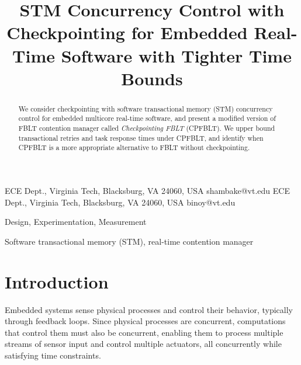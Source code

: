 \documentclass[preprint]{sigplanconf}
\begin{document}
\copyrightdata{[to be supplied]} 


\title{STM Concurrency Control with Checkpointing for Embedded Real-Time Software with Tighter Time Bounds}

           {ECE Dept., Virginia Tech, Blacksburg, VA 24060, USA}
           {shambake@vt.edu}
           {ECE Dept., Virginia Tech, Blacksburg, VA 24060, USA}
           {binoy@vt.edu}

\maketitle

\begin{abstract}
We consider checkpointing with software transactional memory (STM) concurrency control for embedded multicore real-time software, and present a modified version of FBLT contention manager called \textit{Checkpointing FBLT} (CPFBLT). We upper bound transactional retries and task response times under CPFBLT, and identify when CPFBLT is a more appropriate alternative to FBLT without checkpointing.
\end{abstract}


\terms
Design, Experimentation, Measurement

\keywords
Software transactional memory (STM), real-time contention manager

\section{Introduction}

\label{sec:intro}

Embedded systems sense physical processes and control their behavior, typically through feedback loops. Since physical processes are concurrent, computations that control them must also be concurrent, enabling them to process multiple streams of sensor input and control multiple actuators, all concurrently while satisfying time constraints. 
\end{document}
